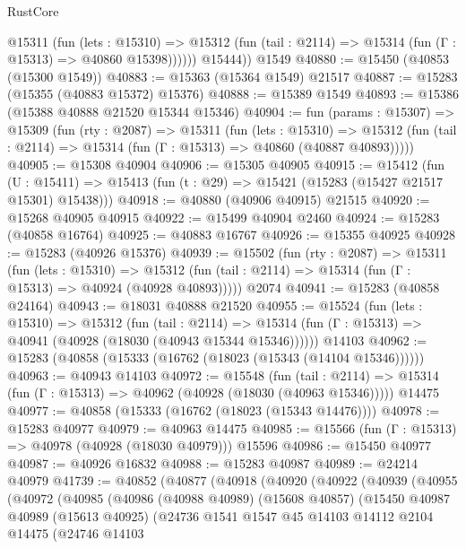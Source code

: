 \begin{lexlean}{RustCore}
\begin{coremodule}
            @15311
              (fun (lets : @15310) =>
              @15312 (fun (tail : @2114) => @15314 (fun (Γ : @15313) => @40860 @15398))))))
        @15444))
    @1549
@40880 := @15450 (@40853 (@15300 @1549))
@40883 := @15363 (@15364 @1549) @21517
@40887 := @15283 (@15355 (@40883 @15372) @15376)
@40888 := @15389 @1549
@40893 := @15386 (@15388 @40888 @21520 @15344 @15346)
@40904 := fun (params : @15307) =>
  @15309
    (fun (rty : @2087) =>
    @15311
      (fun (lets : @15310) =>
      @15312 (fun (tail : @2114) => @15314 (fun (Γ : @15313) => @40860 (@40887 @40893)))))
@40905 := @15308 @40904
@40906 := @15305 @40905
@40915 := @15412
    (fun (U : @15411) => @15413 (fun (t : @29) => @15421 (@15283 (@15427 @21517 @15301) @15438)))
@40918 := @40880 (@40906 @40915) @21515
@40920 := @15268 @40905 @40915
@40922 := @15499 @40904 @2460
@40924 := @15283 (@40858 @16764)
@40925 := @40883 @16767
@40926 := @15355 @40925
@40928 := @15283 (@40926 @15376)
@40939 := @15502
    (fun (rty : @2087) =>
    @15311
      (fun (lets : @15310) =>
      @15312 (fun (tail : @2114) => @15314 (fun (Γ : @15313) => @40924 (@40928 @40893)))))
    @2074
@40941 := @15283 (@40858 @24164)
@40943 := @18031 @40888 @21520
@40955 := @15524
    (fun (lets : @15310) =>
    @15312
      (fun (tail : @2114) =>
      @15314 (fun (Γ : @15313) => @40941 (@40928 (@18030 (@40943 @15344 @15346))))))
    @14103
@40962 := @15283 (@40858 (@15333 (@16762 (@18023 (@15343 (@14104 @15346))))))
@40963 := @40943 @14103
@40972 := @15548
    (fun (tail : @2114) => @15314 (fun (Γ : @15313) => @40962 (@40928 (@18030 (@40963 @15346)))))
    @14475
@40977 := @40858 (@15333 (@16762 (@18023 (@15343 @14476))))
@40978 := @15283 @40977
@40979 := @40963 @14475
@40985 := @15566 (fun (Γ : @15313) => @40978 (@40928 (@18030 @40979))) @15596
@40986 := @15450 @40977
@40987 := @40926 @16832
@40988 := @15283 @40987
@40989 := @24214 @40979
@41739 := @40852
    (@40877
      (@40918
        (@40920
          (@40922
            (@40939
              (@40955
                (@40972
                  (@40985
                    (@40986
                      (@40988 @40989)
                      (@15608 @40857)
                      (@15450
                        @40987
                        @40989
                        (@15613 @40925)
                        (@24736
                          @1541
                          @1547
                          @45
                          @14103
                          @14112
                          @2104
                          @14475
                          (@24746
                            @14103

\end{coremodule}
\end{lexlean}
